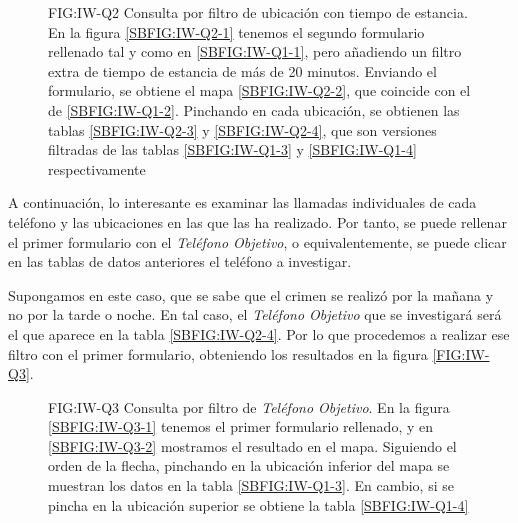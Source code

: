    \begin{figure}[Consulta por filtro de ubicación con tiempo de estancia]{FIG:IW-Q2}
      {Consulta por filtro de ubicación con tiempo de estancia. En la figura \ref{SBFIG:IW-Q2-1} tenemos el segundo formulario rellenado tal y como en \ref{SBFIG:IW-Q1-1}, pero añadiendo un filtro extra de tiempo de estancia de más de 20 minutos. Enviando el formulario, se obtiene el mapa \ref{SBFIG:IW-Q2-2}, que coincide con el de \ref{SBFIG:IW-Q1-2}. Pinchando en cada ubicación, se obtienen las tablas \ref{SBFIG:IW-Q2-3} y \ref{SBFIG:IW-Q2-4}, que son versiones filtradas de las tablas \ref{SBFIG:IW-Q1-3} y \ref{SBFIG:IW-Q1-4} respectivamente}
      \quad
      \quad
      \quad
    \end{figure}
    
    A continuación, lo interesante es examinar las llamadas individuales de cada teléfono y las ubicaciones en las que las ha realizado. Por tanto, se puede rellenar el primer formulario con el \textit{Teléfono Objetivo}, o equivalentemente, se puede clicar en las tablas de datos anteriores el teléfono a investigar.
    
    Supongamos en este caso, que se sabe que el crimen se realizó por la mañana y no por la tarde o noche. En tal caso, el \textit{Teléfono Objetivo} que se investigará será el que aparece en la tabla \ref{SBFIG:IW-Q2-4}. Por lo que procedemos a realizar ese filtro con el primer formulario, obteniendo los resultados en la figura \ref{FIG:IW-Q3}. 
    
    \begin{figure}[Consulta por filtro de \textit{Teléfono Objetivo}]{FIG:IW-Q3}
      {Consulta por filtro de \textit{Teléfono Objetivo}. En la figura \ref{SBFIG:IW-Q3-1} tenemos el primer formulario rellenado, y en \ref{SBFIG:IW-Q3-2} mostramos el resultado en el mapa. Siguiendo el orden de la flecha, pinchando en la ubicación inferior del mapa se muestran los datos en la tabla \ref{SBFIG:IW-Q1-3}. En cambio, si se pincha en la ubicación superior se obtiene la tabla \ref{SBFIG:IW-Q1-4}}
      \quad
      \quad
      \quad
    \end{figure}
  
